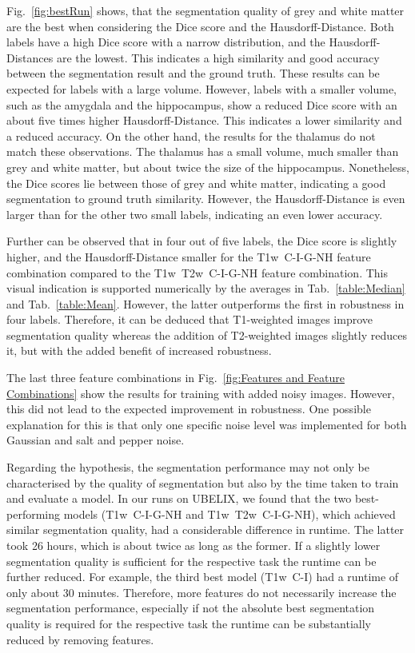 \documentclass[conference]{IEEEtran}
\begin{document}
Fig.~\ref{fig:bestRun} shows, that the segmentation quality of grey and white matter are the best when considering the Dice score and the Hausdorff-Distance. Both labels have a high Dice score with a narrow distribution, and the Hausdorff-Distances are the lowest. This indicates a high similarity and good accuracy between the segmentation result and the ground truth. These results can be expected for labels with a large volume. However, labels with a smaller volume, such as the amygdala and the hippocampus, show a reduced Dice score with an about five times higher Hausdorff-Distance. This indicates a lower similarity and a reduced accuracy. On the other hand, the results for the thalamus do not match these observations. The thalamus has a small volume, much smaller than grey and white matter, but about twice the size of the hippocampus. Nonetheless, the Dice scores lie between those of grey and white matter, indicating a good segmentation to ground truth similarity. However, the Hausdorff-Distance is even larger than for the other two small labels, indicating an even lower accuracy.

Further can be observed that in four out of five labels, the Dice score is slightly higher, and the Hausdorff-Distance smaller for the T1w~C-I-G-NH feature combination compared to the T1w~T2w~C-I-G-NH feature combination. This visual indication is supported numerically by the averages in Tab.~\ref{table:Median} and Tab.~\ref{table:Mean}. However, the latter outperforms the first in robustness in four labels. Therefore, it can be deduced that T1-weighted images improve segmentation quality whereas the addition of T2-weighted images slightly reduces it, but with the added benefit of increased robustness.

The last three feature combinations in Fig.~\ref{fig:Features and Feature Combinations} show the results for training with added noisy images. However, this did not lead to the expected improvement in robustness. One possible explanation for this is that only one specific noise level was implemented for both Gaussian and salt and pepper noise.

Regarding the hypothesis, the segmentation performance may not only be characterised by the quality of segmentation but also by the time taken to train and evaluate a model. In our runs on UBELIX, we found that the two best-performing models (T1w~C-I-G-NH and T1w~T2w~C-I-G-NH), which achieved similar segmentation quality, had a considerable difference in runtime. The latter took 26 hours, which is about twice as long as the former. If a slightly lower segmentation quality is sufficient for the respective task the runtime can be further reduced. For example, the third best model (T1w~C-I) had a runtime of only about 30 minutes. Therefore, more features do not necessarily increase the segmentation performance, especially if not the absolute best segmentation quality is required for the respective task the runtime can be substantially reduced by removing features.
\end{document}
